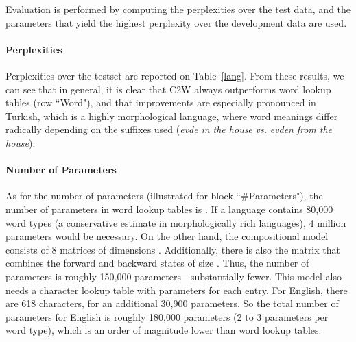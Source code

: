\documentclass[11pt]{article}
\newcommand{\ignore}[1]{}
\newcommand{\examp}[1]{\emph{#1}}
\begin{document}
\begin{CJK*}{UTF8}{gbsn}
Evaluation is performed by computing the perplexities over the test data, and the parameters that yield the highest perplexity over the development data are used.

\paragraph{Perplexities}
Perplexities over the testset are reported on Table~\ref{lang}. From these results, we can see that in general, it is clear that C2W always outperforms word lookup tables (row ``Word"), and that improvements are especially pronounced in Turkish, which is a highly morphological language, where word meanings differ radically depending on the suffixes used (\examp{evde}  \examp{in the house} \emph{vs.} \examp{evden}  \examp{from the house}). \ignore{ For instance, the Turkish word for \examp{ev}~(English \examp{house}), attached with the suffix \examp{-de}, changes its meaning to \examp{in the house}, while adding the suffix \examp{-den} would mean \examp{from the house}. Thus, while the C2W model can learn that the suffix \examp{-de} means inside the stem of the word, word lookup tables would need to have examples for every word with the suffix \examp{-de} to learn good vector representations. Furthermore, as it is not uncommon for multiple suffixes to be added to a word, suffix features would not suffice to learn this morphological process. Improvements on other languages are not as significant, but consistent. For instance, in Portuguese, gender is encoded into nouns as suffixes, for instance, a male cat is spelled as \examp{gato}, a female one as \examp{gata}. Thus, a word lookup table would require all nouns to occur in both forms, while the C2W model can also generalize this process.}

\paragraph{Number of Parameters}
As for the number of parameters (illustrated for block ``\#Parameters"), the number of parameters in word lookup tables is . If a language contains 80,000 word types (a conservative estimate in morphologically rich languages), 4 million parameters would be necessary.  On the other hand, the compositional model consists of 8 matrices of dimensions . Additionally, there is also the matrix that combines the forward and backward states of size . Thus, the number of parameters is roughly 150,000 parameters---substantially fewer. This model also needs a character lookup table with  parameters for each entry. For English, there are 618 characters, for an additional 30,900 parameters. So the total number of parameters for English is roughly 180,000 parameters (2 to 3 parameters per word type), which is an order of magnitude lower than word lookup tables.


\end{CJK*}
\end{document}
